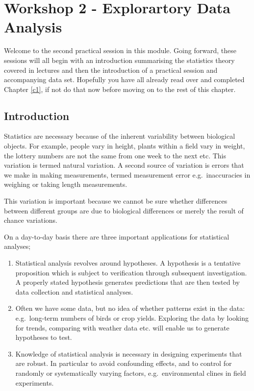 \documentclass[
]{book}
\begin{document}
\chapter{Workshop 2 - Explorartory Data Analysis}\label{workshop-2---explorartory-data-analysis}

Welcome to the second practical session in this module. Going forward, these sessions will all begin with an introduction summarising the statistics theory covered in lectures and then the introduction of a practical session and accompanying data set. Hopefully you have all already read over and completed Chapter \ref{c1}, if not do that now before moving on to the rest of this chapter.

\section{Introduction}\label{introduction-1}

Statistics are necessary because of the inherent variability between biological objects. For example, people vary in height, plants within a field vary in weight, the lottery numbers are not the same from one week to the next etc. This variation is termed natural variation. A second source of variation is errors that we make in making measurements, termed measurement error e.g.~inaccuracies in weighing or taking length measurements.

This variation is important because we cannot be sure whether differences between different groups are due to biological differences or merely the result of chance variations.

On a day-to-day basis there are three important applications for statistical analyses;

\begin{enumerate}
\def\labelenumi{\arabic{enumi})}
\item
  Statistical analysis revolves around hypotheses. A hypothesis is a tentative proposition which is subject to verification through subsequent investigation. A properly stated hypothesis generates predictions that are then tested by data collection and statistical analyses.
\item
  Often we have some data, but no idea of whether patterns exist in the data: e.g.~long-term numbers of birds or crop yields. Exploring the data by looking for trends, comparing with weather data etc. will enable us to generate hypotheses to test.
\item
  Knowledge of statistical analysis is necessary in designing experiments that are robust. In particular to avoid confounding effects, and to control for randomly or systematically varying factors, e.g.~environmental clines in field experiments.
\end{enumerate}
\end{document}
